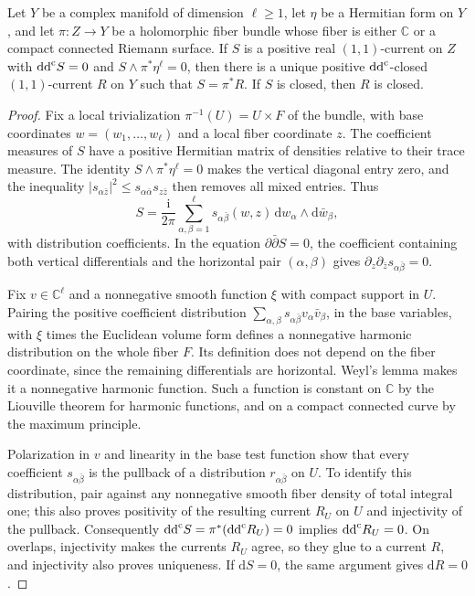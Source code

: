 \begin{lemma}\label{lem:horizontal-pluriharmonic-descent}
Let $Y$ be a complex manifold of dimension $\ell\geq1$, let $\eta$ be a Hermitian form on $Y$, and let $\pi\colon Z\to Y$ be a holomorphic fiber bundle whose fiber is either $\mathbb C$ or a compact connected Riemann surface. If $S$ is a positive real $(1,1)$-current on $Z$ with $\mathrm{dd}^{\mathrm{c}} S=0$ and $S\wedge\pi^*\eta^\ell=0$, then there is a unique positive $\mathrm{dd}^{\mathrm{c}}$-closed $(1,1)$-current $R$ on $Y$ such that $S=\pi^*R$. If $S$ is closed, then $R$ is closed.
\end{lemma}
\begin{proof}
Fix a local trivialization $\pi^{-1}(U)=U\times F$ of the bundle, with base coordinates $w=(w_1,\ldots,w_\ell)$ and a local fiber coordinate $z$. The coefficient measures of $S$ have a positive Hermitian matrix of densities relative to their trace measure. The identity $S\wedge\pi^*\eta^\ell=0$ makes the vertical diagonal entry zero, and the inequality $|s_{\alpha\bar z}|^2\leq s_{\alpha\bar\alpha}s_{z\bar z}$ then removes all mixed entries. Thus
\[
 S=\frac{\mathrm{i}}{2\pi}\sum_{\alpha,\beta=1}^\ell s_{\alpha\bar\beta}(w,z)\,\mathrm{d}w_\alpha\wedge\mathrm{d}\bar w_\beta,
\]
with distribution coefficients. In the equation $\partial\bar\partial S=0$, the coefficient containing both vertical differentials and the horizontal pair $(\alpha,\beta)$ gives $\partial_z\partial_{\bar z}s_{\alpha\bar\beta}=0$.

Fix $v\in\mathbb C^\ell$ and a nonnegative smooth function $\xi$ with compact support in $U$. Pairing the positive coefficient distribution $\sum_{\alpha,\beta}s_{\alpha\bar\beta}v_\alpha\bar v_\beta$, in the base variables, with $\xi$ times the Euclidean volume form defines a nonnegative harmonic distribution on the whole fiber $F$. Its definition does not depend on the fiber coordinate, since the remaining differentials are horizontal. Weyl's lemma makes it a nonnegative harmonic function. Such a function is constant on $\mathbb C$ by the Liouville theorem for harmonic functions, and on a compact connected curve by the maximum principle.

Polarization in $v$ and linearity in the base test function show that every coefficient $s_{\alpha\bar\beta}$ is the pullback of a distribution $r_{\alpha\bar\beta}$ on $U$. To identify this distribution, pair against any nonnegative smooth fiber density of total integral one; this also proves positivity of the resulting current $R_U$ on $U$ and injectivity of the pullback. Consequently $\mathrm{dd}^{\mathrm{c}} S=\pi^*(\mathrm{dd}^{\mathrm{c}} R_U)=0$ implies $\mathrm{dd}^{\mathrm{c}} R_U=0$. On overlaps, injectivity makes the currents $R_U$ agree, so they glue to a current $R$, and injectivity also proves uniqueness. If $\mathrm{d}S=0$, the same argument gives $\mathrm{d}R=0$.
\end{proof}

